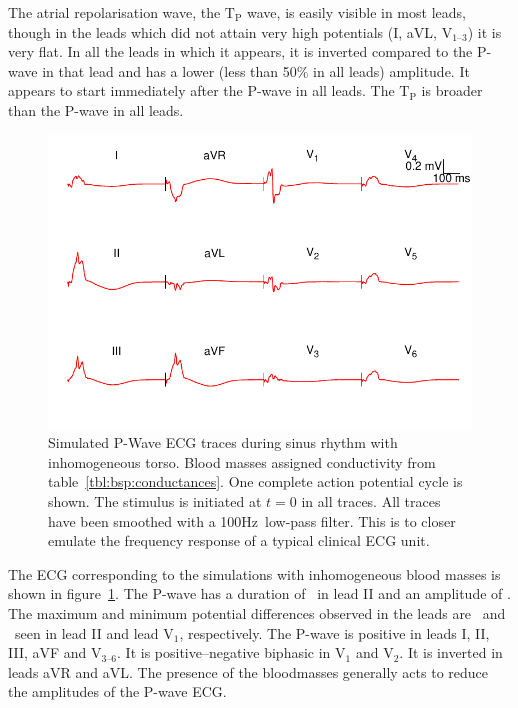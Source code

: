 The atrial repolarisation wave, the $\text{T}_{\text{P}}$ wave, is easily
visible in most leads, though in the leads which did not attain very high
potentials (I, aVL, $\text{V}_{\text{1--3}}$) it is very flat.
In all the leads in which it appears, it is inverted compared to the P-wave in
that lead and has a lower (less than 50\% in all leads) amplitude.
It appears to start immediately after the P-wave in all leads.
The $\text{T}_{\text{P}}$ is broader than the P-wave in all leads.


\begin{figure}
\includegraphics{figures/bsp/ecg_blood}
\caption[12 lead ECG during sinus rhythm, bloodmasses present.]{
\label{bsp:fig:ecg_blood}
Simulated P-Wave ECG traces during sinus rhythm with inhomogeneous torso.
Blood masses assigned conductivity from table~\ref{tbl:bsp:conductances}.
One complete action potential cycle is shown.
The stimulus is initiated at $t = 0$ in all traces.
All traces have been smoothed with a \unit{100}{Hz}\ low-pass filter.
This is to closer emulate the frequency response of a typical clinical ECG unit.
}
\end{figure}

The ECG corresponding to the simulations with inhomogeneous blood masses is shown in
figure~\ref{bsp:fig:ecg_blood}.
The P-wave has a duration of \ in lead II and an amplitude of .
The maximum and minimum potential differences observed in the leads are
\ and \ seen in lead II and lead $\text{V}_{\text{1}}$, respectively.
The P-wave is positive in leads I, II, III, aVF and $\text{V}_{\text{3--6}}$.
It is positive--negative biphasic in $\text{V}_{\text{1}}$ and $\text{V}_{\text{2}}$.
It is inverted in leads aVR and aVL.
The presence of the bloodmasses generally acts to reduce the amplitudes of the
P-wave ECG.

